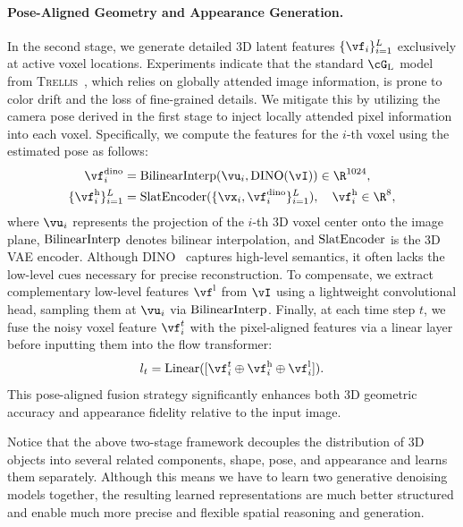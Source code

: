 \documentclass[../../book-main.tex]{subfiles}
\begin{document}
\paragraph{Pose-Aligned Geometry and Appearance Generation.}
In the second stage, we generate detailed 3D latent features \(\{ \feat_{i} \}_{i=1}^{\numpts}\) exclusively at active voxel locations.
Experiments indicate that the standard \(\lflow\) model from \textsc{Trellis}~\citep{xiang2025structured}, which relies on globally attended image information, is prone to color drift and the loss of fine-grained details.
We mitigate this by utilizing the camera pose derived in the first stage to inject locally attended pixel information into each voxel.
Specifically, we compute the features for the \(i\)-th voxel using the estimated pose as follows:
\begin{align}
\feat^{\mathrm{dino}}_{i} &= \interp(\pixcoord_{i}, \operatorname{DINO}(\image)) \in \R^{1024} , \\
\{\feat^{\high}_{i}\}_{i=1}^{\numpts} &= \slatenc(\{\point_{i}, \feat^{\mathrm{dino}}_{i}\}_{i=1}^{\numpts}), \quad \feat^{\high}_{i} \in \R^{8} , \label{eq:latent}
\end{align}
where \(\pixcoord_{i}\) represents the projection of the \(i\)-th 3D voxel center onto the image plane, \(\operatorname{BilinearInterp}\) denotes bilinear interpolation, and \(\operatorname{SlatEncoder}\) is the 3D VAE encoder.
Although DINO~\citep{oquab2023dinov2} captures high-level semantics, it often lacks the low-level cues necessary for precise reconstruction.
To compensate, we extract complementary low-level features \(\feat^{\low}\) from \(\image\) using a lightweight convolutional head, sampling them at \(\pixcoord_{i}\) via \(\operatorname{BilinearInterp}\).
Finally, at each time step \(t\), we fuse the noisy voxel feature \(\feat_{i}^{t}\) with the pixel-aligned features via a linear layer before inputting them into the flow transformer:
\begin{equation}
l_{t} = \mathrm{Linear}([\feat_{i}^{t} \oplus \feat^{\high}_{i} \oplus \feat^{\low}_{i}]) .
\end{equation}
This pose-aligned fusion strategy significantly enhances both 3D geometric accuracy and appearance fidelity relative to the input image.

\begin{remark}
Notice that the above two-stage framework decouples the distribution
of 3D objects into several related components, shape, pose, and
appearance and learns them separately.
Although this means we have to
learn two generative denoising models together, the resulting learned
representations are much better structured and enable much more
precise and flexible spatial reasoning and generation.
\end{remark}
\end{document}
